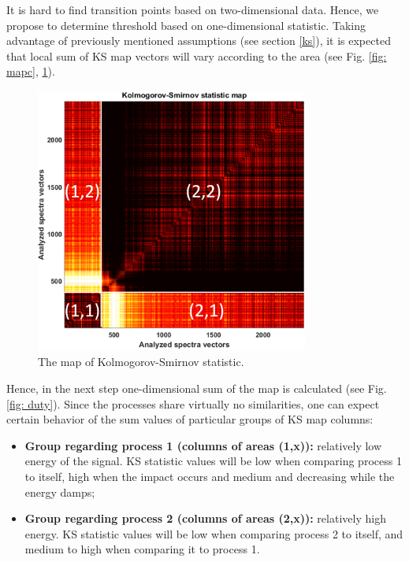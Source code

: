\documentclass[smallextended]{svjour3}       %
\begin{document}
It is hard to find transition points based on two-dimensional data. Hence, we propose to determine threshold based on one-dimensional statistic. Taking advantage of previously mentioned assumptions (see section \ref{ks}), it is expected that local sum of KS map vectors will vary according to the area (see Fig. \ref{fig: mapc}, \ref{fig: map}). 

\begin{figure}[!ht]
\centering
\includegraphics[width = 0.8\textwidth]{figs/map2.png}
\caption{The map of Kolmogorov-Smirnov statistic.}
\label{fig: map}
\end{figure}

Hence, in the next step one-dimensional sum of the map is calculated (see Fig. \ref{fig: duty}). Since the processes share virtually no similarities, one can expect certain behavior of the sum values of particular groups of KS map columns:

\begin{itemize}
\item \textbf{Group regarding process 1 (columns of areas (1,x)):} relatively low energy of the signal. KS statistic values will be low when comparing process 1 to itself, high when the impact occurs and medium and decreasing while the energy damps;
\item \textbf{Group regarding process 2 (columns of areas (2,x)):} relatively high energy. KS statistic values will be low when comparing process 2 to itself, and medium to high when comparing it to process 1.
\end{itemize}
\end{document}

